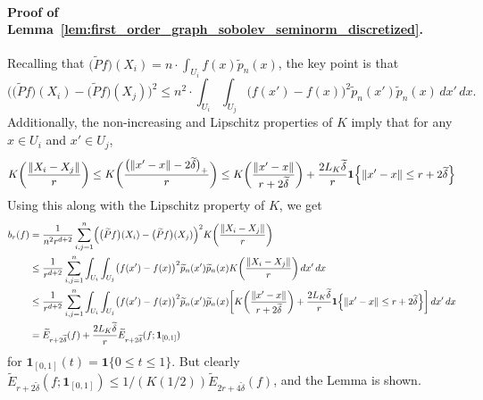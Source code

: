 \documentclass[twoside]{article}
\newcommand{\1}{\mathbf{1}}
\newcommand{\wt}[1]{\widetilde{#1}}
\theoremstyle{definition}
\theoremstyle{remark}
\begin{document}
\paragraph{Proof of Lemma~\ref{lem:first_order_graph_sobolev_seminorm_discretized}.}
Recalling that $\bigl(\wt{P}f\bigr)(X_i) = n \cdot \int_{U_i} f(x) \wt{p}_n(x)$, the key point is that
\begin{equation*}
\biggl(\bigl(\wt{P}f\bigr)(X_i) - \bigl(\wt{P}f\bigr)(X_j)\biggr)^2 \leq n^2 \cdot \int_{U_i} \int_{U_j} \bigl(f(x') - f(x)\bigr)^2 \wt{p}_n(x') \wt{p}_n(x) \,dx' \,dx.
\end{equation*}
Additionally, the non-increasing and Lipschitz properties of $K$ imply that for any $x \in U_i$ and $x' \in U_j$, 
\begin{equation*}
K\biggl(\frac{\|X_i - X_j\|}{r}\biggr) \leq K\biggl(\frac{\bigl(\|x' - x\| - 2\wt{\delta}\bigr)_{+}}{r}\biggr) \leq K\biggl(\frac{\|x' - x\|}{r + 2\wt{\delta}}\biggr) + \frac{2L_K\wt{\delta}}{r}\1\Bigl\{\|x' - x\| \leq r + 2\wt{\delta}\Bigr\}
\end{equation*}
Using this along with the Lipschitz property of $K$, we get
\begin{align*}
b_r(f) & = \frac{1}{n^2r^{d + 2}} \sum_{i,j = 1}^n \Bigl(\bigl(\wt{P}f\bigr)(X_i) - \bigl(\wt{P}f\bigr)(X_j)\Bigr)^2 K\biggl(\frac{\|X_i - X_j\|}{r}\biggr) \\
& \leq \frac{1}{r^{d + 2}} \sum_{i,j = 1}^n \int_{U_i} \int_{U_j}  \bigl(f(x') - f(x)\bigr)^2 \wt{p}_n(x') \wt{p}_n(x) K\biggl(\frac{\|X_i - X_j\|}{r}\biggr) \,dx' \,dx \\
& \leq \frac{1}{r^{d + 2}} \sum_{i,j = 1}^n \int_{U_i} \int_{U_j}  \bigl(f(x') - f(x)\bigr)^2 \wt{p}_n(x') \wt{p}_n(x) \biggl[K\biggl(\frac{\|x' - x\|}{r + 2\wt{\delta}}\biggr) + \frac{2L_K\wt{\delta}}{r}\1\Bigl\{\|x' - x\| \leq r + 2\wt{\delta}\Bigr\}\biggr] \,dx' \,dx \\
& = \wt{E}_{r + 2\wt{\delta}}(f) + \frac{2L_K\wt{\delta}}{r}\wt{E}_{r + 2\wt{\delta}}(f; \1_{[0,1]})
\end{align*}
for $\1_{[0,1]}(t) = \1\{0 \leq t \leq 1\}$. But clearly $\wt{E}_{r + 2\wt\delta}(f; \1_{[0,1]}) \leq 1/(K(1/2))\wt{E}_{2r + 4\wt{\delta}}(f)$, and the Lemma is shown.
\end{document}
